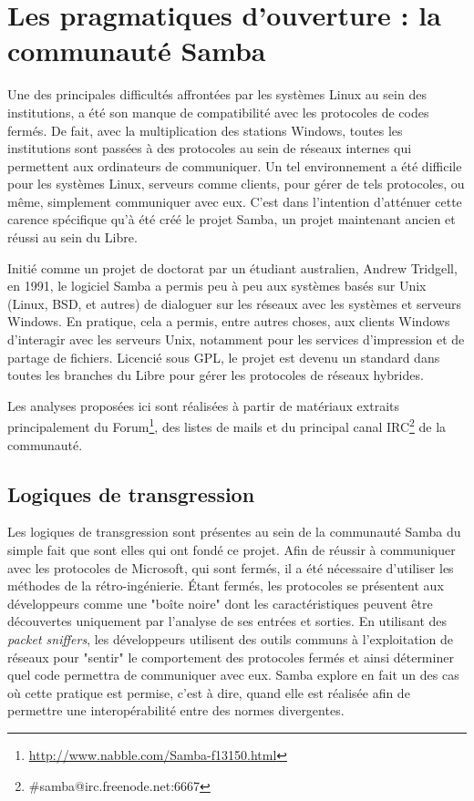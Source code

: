 \section{Les pragmatiques d'ouverture : la communauté Samba}\label{3.2}

Une des principales difficultés affrontées par les systèmes Linux au sein des institutions, a été son manque de compatibilité avec les protocoles de codes fermés. De fait, avec la multiplication des stations Windows, toutes les institutions sont passées à des protocoles au sein de réseaux internes qui permettent aux ordinateurs de communiquer. Un tel environnement a été difficile pour les systèmes Linux, serveurs comme clients, pour gérer de tels protocoles, ou même, simplement communiquer avec eux. C'est dans l'intention d'atténuer cette carence spécifique qu'à été créé le projet Samba, un projet maintenant ancien et réussi au sein du Libre.

Initié comme un projet de doctorat par un étudiant australien, Andrew Tridgell, en 1991, le logiciel Samba a permis peu à peu aux systèmes basés sur Unix (Linux, BSD, et autres) de dialoguer sur les réseaux avec les systèmes et serveurs Windows. En pratique, cela a permis, entre autres choses, aux clients Windows d'interagir avec les serveurs Unix, notamment pour les services d'impression et de partage de fichiers. Licencié sous GPL, le projet est devenu un standard dans toutes les branches du Libre pour gérer les protocoles de réseaux hybrides.

Les analyses proposées ici sont réalisées à partir de matériaux extraits principalement du Forum\footnote{\url{http://www.nabble.com/Samba-f13150.html}}, des listes de mails et du principal canal IRC\footnote{\#samba@irc.freenode.net:6667} de la communauté.

\subsection{Logiques de transgression}\label{3.2.1}

Les logiques de transgression sont présentes au sein de la communauté Samba  du simple fait que sont elles qui ont fondé ce projet. Afin de réussir à communiquer avec les protocoles de Microsoft, qui sont fermés, il a été nécessaire d'utiliser les méthodes de la rétro-ingénierie. \'Etant fermés, les protocoles se présentent aux développeurs comme une "boîte noire" dont les caractéristiques peuvent être découvertes uniquement par l'analyse de ses entrées et sorties. En utilisant des \emph{packet sniffers}, les développeurs utilisent des outils communs à l'exploitation de réseaux pour "sentir" le comportement des protocoles fermés et ainsi déterminer quel code permettra de communiquer avec eux. Samba explore en fait un des cas où cette pratique est permise, c'est à dire, quand elle est réalisée afin de permettre une interopérabilité entre des normes divergentes.

